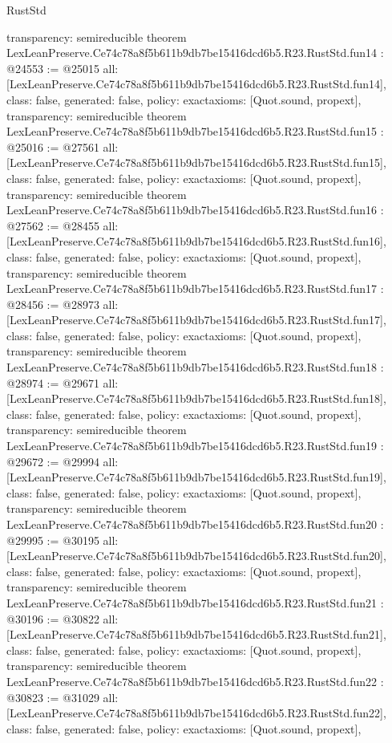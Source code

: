 \begin{lexlean}{RustStd}
\begin{coremodule}
{  transparency: semireducible
}
theorem LexLeanPreserve.Ce74c78a8f5b611b9db7be15416dcd6b5.R23.RustStd.fun14 : @24553 := @25015 {
  all: [LexLeanPreserve.Ce74c78a8f5b611b9db7be15416dcd6b5.R23.RustStd.fun14],
  class: false,
  generated: false,
  policy: exact{axioms: [Quot.sound, propext]},
  transparency: semireducible
}
theorem LexLeanPreserve.Ce74c78a8f5b611b9db7be15416dcd6b5.R23.RustStd.fun15 : @25016 := @27561 {
  all: [LexLeanPreserve.Ce74c78a8f5b611b9db7be15416dcd6b5.R23.RustStd.fun15],
  class: false,
  generated: false,
  policy: exact{axioms: [Quot.sound, propext]},
  transparency: semireducible
}
theorem LexLeanPreserve.Ce74c78a8f5b611b9db7be15416dcd6b5.R23.RustStd.fun16 : @27562 := @28455 {
  all: [LexLeanPreserve.Ce74c78a8f5b611b9db7be15416dcd6b5.R23.RustStd.fun16],
  class: false,
  generated: false,
  policy: exact{axioms: [Quot.sound, propext]},
  transparency: semireducible
}
theorem LexLeanPreserve.Ce74c78a8f5b611b9db7be15416dcd6b5.R23.RustStd.fun17 : @28456 := @28973 {
  all: [LexLeanPreserve.Ce74c78a8f5b611b9db7be15416dcd6b5.R23.RustStd.fun17],
  class: false,
  generated: false,
  policy: exact{axioms: [Quot.sound, propext]},
  transparency: semireducible
}
theorem LexLeanPreserve.Ce74c78a8f5b611b9db7be15416dcd6b5.R23.RustStd.fun18 : @28974 := @29671 {
  all: [LexLeanPreserve.Ce74c78a8f5b611b9db7be15416dcd6b5.R23.RustStd.fun18],
  class: false,
  generated: false,
  policy: exact{axioms: [Quot.sound, propext]},
  transparency: semireducible
}
theorem LexLeanPreserve.Ce74c78a8f5b611b9db7be15416dcd6b5.R23.RustStd.fun19 : @29672 := @29994 {
  all: [LexLeanPreserve.Ce74c78a8f5b611b9db7be15416dcd6b5.R23.RustStd.fun19],
  class: false,
  generated: false,
  policy: exact{axioms: [Quot.sound, propext]},
  transparency: semireducible
}
theorem LexLeanPreserve.Ce74c78a8f5b611b9db7be15416dcd6b5.R23.RustStd.fun20 : @29995 := @30195 {
  all: [LexLeanPreserve.Ce74c78a8f5b611b9db7be15416dcd6b5.R23.RustStd.fun20],
  class: false,
  generated: false,
  policy: exact{axioms: [Quot.sound, propext]},
  transparency: semireducible
}
theorem LexLeanPreserve.Ce74c78a8f5b611b9db7be15416dcd6b5.R23.RustStd.fun21 : @30196 := @30822 {
  all: [LexLeanPreserve.Ce74c78a8f5b611b9db7be15416dcd6b5.R23.RustStd.fun21],
  class: false,
  generated: false,
  policy: exact{axioms: [Quot.sound, propext]},
  transparency: semireducible
}
theorem LexLeanPreserve.Ce74c78a8f5b611b9db7be15416dcd6b5.R23.RustStd.fun22 : @30823 := @31029 {
  all: [LexLeanPreserve.Ce74c78a8f5b611b9db7be15416dcd6b5.R23.RustStd.fun22],
  class: false,
  generated: false,
  policy: exact{axioms: [Quot.sound, propext]},
}
\end{coremodule}
\end{lexlean}
